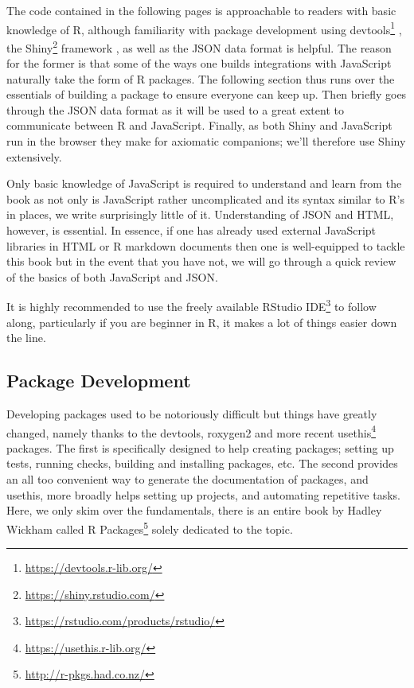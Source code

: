 \documentclass[
]{krantz}
\renewcommand{\href}[2]{#2\footnote{\url{#1}}}
\begin{document}
The code contained in the following pages is approachable to readers with basic knowledge of R, although familiarity with package development using \href{https://devtools.r-lib.org/}{devtools} \citep{R-devtools}, the \href{https://shiny.rstudio.com/}{Shiny} framework \citep{R-shiny}, as well as the JSON data format is helpful. The reason for the former is that some of the ways one builds integrations with JavaScript naturally take the form of R packages. The following section thus runs over the essentials of building a package to ensure everyone can keep up. Then briefly goes through the JSON data format as it will be used to a great extent to communicate between R and JavaScript. Finally, as both Shiny and JavaScript run in the browser they make for axiomatic companions; we'll therefore use Shiny extensively.

Only basic knowledge of JavaScript is required to understand and learn from the book as not only is JavaScript rather uncomplicated and its syntax similar to R's in places, we write surprisingly little of it. Understanding of JSON and HTML, however, is essential. In essence, if one has already used external JavaScript libraries in HTML or R markdown documents then one is well-equipped to tackle this book but in the event that you have not, we will go through a quick review of the basics of both JavaScript and JSON.

It is highly recommended to use the freely available \href{https://rstudio.com/products/rstudio/}{RStudio IDE} to follow along, particularly if you are beginner in R, it makes a lot of things easier down the line.

\hypertarget{package-development}{%
\subsection*{Package Development}\label{package-development}}


Developing packages used to be notoriously difficult but things have greatly changed, namely thanks to the devtools, roxygen2 \citep{R-roxygen2} and more recent \href{https://usethis.r-lib.org/}{usethis} \citep{R-usethis} packages. The first is specifically designed to help creating packages; setting up tests, running checks, building and installing packages, etc. The second provides an all too convenient way to generate the documentation of packages, and usethis, more broadly helps setting up projects, and automating repetitive tasks. Here, we only skim over the fundamentals, there is an entire book by Hadley Wickham called \href{http://r-pkgs.had.co.nz/}{R Packages} solely dedicated to the topic.
\end{document}
